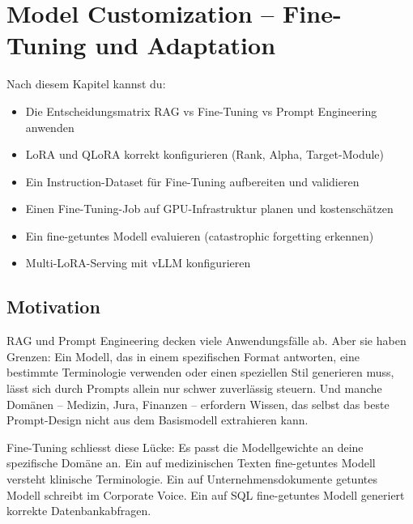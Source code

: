 \chapter{Model Customization -- Fine-Tuning und Adaptation}
\label{chap:finetuning}

\begin{lernziele}
Nach diesem Kapitel kannst du:
\begin{itemize}
    \item Die Entscheidungsmatrix RAG vs Fine-Tuning vs Prompt Engineering anwenden
    \item LoRA und QLoRA korrekt konfigurieren (Rank, Alpha, Target-Module)
    \item Ein Instruction-Dataset für Fine-Tuning aufbereiten und validieren
    \item Einen Fine-Tuning-Job auf GPU-Infrastruktur planen und kostenschätzen
    \item Ein fine-getuntes Modell evaluieren (catastrophic forgetting erkennen)
    \item Multi-LoRA-Serving mit vLLM konfigurieren
\end{itemize}
\end{lernziele}

\section{Motivation}

RAG und Prompt Engineering decken viele Anwendungsfälle ab. Aber sie haben Grenzen: Ein Modell, das in einem spezifischen Format antworten, eine bestimmte Terminologie verwenden oder einen speziellen Stil generieren muss, lässt sich durch Prompts allein nur schwer zuverlässig steuern. Und manche Domänen -- Medizin, Jura, Finanzen -- erfordern Wissen, das selbst das beste Prompt-Design nicht aus dem Basismodell extrahieren kann.

Fine-Tuning schliesst diese Lücke: Es passt die Modellgewichte an deine spezifische Domäne an. Ein auf medizinischen Texten fine-getuntes Modell versteht klinische Terminologie. Ein auf Unternehmensdokumente getuntes Modell schreibt im Corporate Voice. Ein auf SQL fine-getuntes Modell generiert korrekte Datenbankabfragen.

